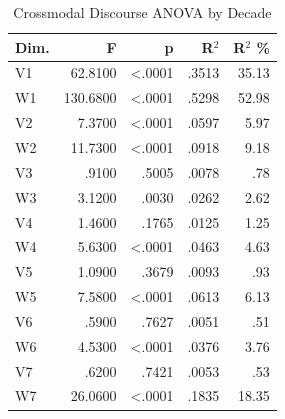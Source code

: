 \begin{table}
\caption{Crossmodal Discourse ANOVA by Decade}
\label{tab:crossmodal_anova}
\begin{tabular}{lrrrr}
\toprule
Dim. & F & p & R$^2$ & R$^2$ \% \\
\midrule
V1 & 62.8100 & <.0001 & .3513 & 35.13 \\
W1 & 130.6800 & <.0001 & .5298 & 52.98 \\
V2 & 7.3700 & <.0001 & .0597 & 5.97 \\
W2 & 11.7300 & <.0001 & .0918 & 9.18 \\
V3 & .9100 & .5005 & .0078 & .78 \\
W3 & 3.1200 & .0030 & .0262 & 2.62 \\
V4 & 1.4600 & .1765 & .0125 & 1.25 \\
W4 & 5.6300 & <.0001 & .0463 & 4.63 \\
V5 & 1.0900 & .3679 & .0093 & .93 \\
W5 & 7.5800 & <.0001 & .0613 & 6.13 \\
V6 & .5900 & .7627 & .0051 & .51 \\
W6 & 4.5300 & <.0001 & .0376 & 3.76 \\
V7 & .6200 & .7421 & .0053 & .53 \\
W7 & 26.0600 & <.0001 & .1835 & 18.35 \\
\bottomrule
\end{tabular}
\end{table}
